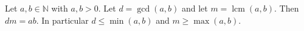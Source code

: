 Let $a, b \in \mathbb{N}$ with $a, b > 0$.
Let $d = \gcd(a, b)$ and let $m = \operatorname{lcm}(a, b)$.
Then $dm = ab$.
In particular $d \leq \min(a, b)$ and $m \geq \max(a, b)$.